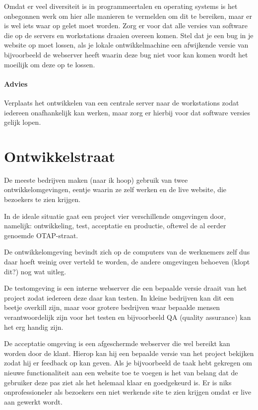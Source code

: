 Omdat er veel diversiteit is in programmeertalen en operating systems is het onbegonnen werk om hier alle manieren te vermelden om dit te bereiken, maar er is wel iets waar op gelet moet worden. Zorg er voor dat alle versies van software die op de servers en workstations draaien overeen komen. Stel dat je een bug in je website op moet lossen, als je lokale ontwikkelmachine een afwijkende versie van bijvoorbeeld de webserver heeft waarin deze bug niet voor kan komen wordt het moeilijk om deze op te lossen.

\paragraph{Advies} Verplaats het ontwikkelen van een centrale server naar de workstations zodat iedereen onafhankelijk kan werken, maar zorg er hierbij voor dat software versies gelijk lopen.

\section{Ontwikkelstraat}

De meeste bedrijven maken (naar ik hoop) gebruik van twee ontwikkelomgevingen, eentje waarin ze zelf werken en de live website, die bezoekers te zien krijgen.

In de ideale situatie gaat een project vier verschillende omgevingen door, namelijk: ontwikkeling, test, acceptatie en productie, oftewel de al eerder genoemde OTAP-straat. 

De ontwikkelomgeving bevindt zich op de computers van de werknemers zelf dus daar hoeft weinig over verteld te worden, de andere omgevingen behoeven (klopt dit?) nog wat uitleg.

De testomgeving is een interne webserver die een bepaalde versie draait van het project zodat iedereen deze daar kan testen. In kleine bedrijven kan dit een beetje overkill zijn, maar voor grotere bedrijven waar bepaalde mensen verantwoordelijk zijn voor het testen en bijvoorbeeld QA (quality assurance) kan het erg handig zijn.

De acceptatie omgeving is een afgeschermde webserver die wel bereikt kan worden door de klant. Hierop kan hij een bepaalde versie van het project bekijken zodat hij er feedback op kan geven. Als je bijvoorbeeld de taak hebt gekregen om nieuwe functionaliteit aan een website toe te voegen is het van belang dat de gebruiker deze pas ziet als het helemaal klaar en goedgekeurd is. Er is niks onprofessioneler als bezoekers een niet werkende site te zien krijgen omdat er live aan gewerkt wordt.

